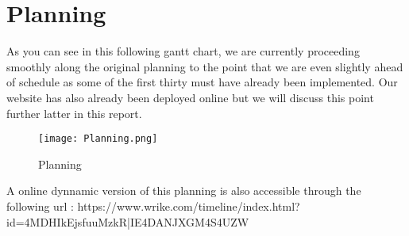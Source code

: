 \section{Planning}

As you can see in this following gantt chart, we are currently proceeding smoothly along the original planning to the point that we are even slightly ahead of schedule as some of the first thirty must have already been implemented. Our website has also already been deployed online but we will discuss this point further latter in this report. \newline

\begin{figure}[H]
	\centering
	\texttt{[image: Planning.png]}
	\caption{Planning}
	\label{fig:length_eight_mouse}
\end{figure}

A online dynnamic version of this planning is also accessible through the following url :
https://www.wrike.com/timeline/index.html?id=4MDHIkEjsfuuMzkR|IE4DANJXGM4S4UZW
